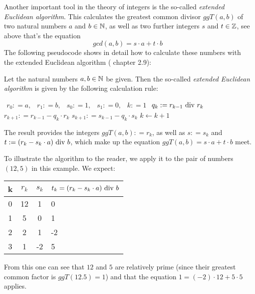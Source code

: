 Another important tool in the theory of integers is the so-called \textit{extended Euclidean algorithm}. This calculates the greatest common divisor $ ggT (a, b) $ of two natural numbers $ a $ and $ b \in \mathbb{N} $, as well as two further integers $ s $ and $ t \in \mathbb{Z} $, see above that's the equation
\begin{equation}
\label{eq: erw_Eukl_algo}
gcd (a, b) = s \cdot a + t \cdot b
\end{equation}
The following pseudocode shows in detail how to calculate these numbers with the extended Euclidean algorithm (\cite{JB} chapter 2.9):
\begin{definition} 
\label{theorem: ext_Euclid}
Let the natural numbers $ a, b \in \mathbb{N} $ be given. Then the so-called \textit{extended Euclidean algorithm} is given by the following calculation rule:
\begin{algorithmic}
\State $ \begin{array}{ccccc}
r_0: = a, & r_1: = b, & s_0: = 1, & s_1: = 0, & k: = 1
\end{array} $
\State $ q_k: = r_{k-1} \text{ div } r_k $
\State $ r_{k + 1}: = r_{k-1} -q_k \cdot r_k $
\State $ s_{k + 1}: = s_{k-1} -q_k \cdot s_k $
\State $ k \gets k + 1 $
\EndWhile
\end{algorithmic}
The result provides the integers $ ggT (a, b): = r_k $, as well as $ s: = s_k $ and $ t: = (r_k-s_k \cdot a) \text{ div } b $, which make up the equation
$ ggT (a, b) = s \cdot a + t \cdot b $ meet.
\end{definition}
\begin{example} To illustrate the algorithm to the reader, we apply it to the pair of numbers $ (12,5) $ in this example.
We expect:
\begin{center}
  \begin{tabular}{c | c c l}
    k & $ r_k $ & $ s_k $ & $ t_k = (r_k-s_k \cdot a) \text{ div } b $ \\\hline
    0 & 12 & 1 & 0 \\
    1 & 5 & 0 & 1 \\
    2 & 2 & 1 & -2 \\
    3 & 1 & -2 & 5 \\
  \end{tabular}
\end{center}
From this one can see that $ 12 $ and $ 5 $ are relatively prime (since their greatest common factor is $ ggT (12.5) = 1 $) and that the equation $ 1 = (-2) \cdot 12 + 5 \cdot 5 $ applies.
\end{example}

